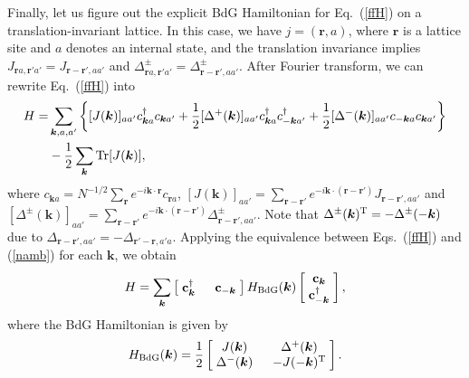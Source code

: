 \documentclass{tADP2e}
\theoremstyle{plain}
\theoremstyle{plain}
\theoremstyle{definition}
\begin{document}
\begin{appendices}
Finally, let us figure out the explicit BdG Hamiltonian for Eq.~(\ref{ffH}) on a translation-invariant lattice. In this case, we have $j=(\boldsymbol{r},a)$, where $\boldsymbol{r}$ is a lattice site and $a$ denotes an internal state, and the translation invariance implies $J_{\boldsymbol{r}a,\boldsymbol{r}'a'}=J_{\boldsymbol{r}-\boldsymbol{r}',aa'}$ and $\Delta^\pm_{\boldsymbol{r}a,\boldsymbol{r}'a'}=\Delta^\pm_{\boldsymbol{r}-\boldsymbol{r}',aa'}$. After Fourier transform, we can rewrite Eq.~(\ref{ffH}) into 
\begin{equation}
\begin{split}
H=&\sum_{\boldsymbol{k},a,a'}\left\{[J(\boldsymbol{k})]_{aa'}c_{\boldsymbol{k}a}^\dag c_{\boldsymbol{k}a'}
+\frac{1}{2}[\Delta^+(\boldsymbol{k})]_{aa'}c_{\boldsymbol{k}a}^\dag c_{-\boldsymbol{k}a'}^\dag+
\frac{1}{2}[\Delta^-(\boldsymbol{k})]_{aa'}c_{-\boldsymbol{k}a} c_{\boldsymbol{k}a'}\right\} \\
&-\frac{1}{2}\sum_{\boldsymbol{k}}{\rm Tr}[J(\boldsymbol{k})],
\end{split}
\end{equation}
where $c_{\boldsymbol{k}a}=N^{-1/2}\sum_{\boldsymbol{r}}e^{-i\boldsymbol{k}\cdot\boldsymbol{r}}c_{\boldsymbol{r}a}$, $[J(\boldsymbol{k})]_{aa'}=\sum_{\boldsymbol{r}-\boldsymbol{r}'}e^{-i\boldsymbol{k}\cdot(\boldsymbol{r}-\boldsymbol{r}')}J_{\boldsymbol{r}-\boldsymbol{r}',aa'}$ and $[\Delta^\pm(\boldsymbol{k})]_{aa'}=\sum_{\boldsymbol{r}-\boldsymbol{r}'}e^{-i\boldsymbol{k}\cdot(\boldsymbol{r}-\boldsymbol{r}')}\Delta^\pm_{\boldsymbol{r}-\boldsymbol{r}',aa'}$. Note that $\Delta^\pm(\boldsymbol{k})^{\rm T}=-\Delta^\pm(-\boldsymbol{k})$ due to $\Delta_{\boldsymbol{r}-\boldsymbol{r}',aa'}=-\Delta_{\boldsymbol{r}'-\boldsymbol{r},a'a}$. Applying the equivalence between Eqs.~(\ref{ffH}) and (\ref{namb}) for each $\boldsymbol{k}$, we obtain
\begin{equation}
H=\sum_{\boldsymbol{k}} \begin{bmatrix} \;\bold{c}_{\boldsymbol{k}}^\dag\; & \;\bold{c}_{-\boldsymbol{k}}\; \end{bmatrix} H_{\rm BdG}(\boldsymbol{k})\begin{bmatrix} \;\bold{c}_{\boldsymbol{k}}\; \\ \;\bold{c}^\dag_{-\boldsymbol{k}}\; \end{bmatrix},
\end{equation}
where the BdG Hamiltonian is given by
\begin{equation}
H_{\rm BdG}(\boldsymbol{k})=\frac{1}{2}\begin{bmatrix} \;J(\boldsymbol{k})\; & \;\Delta^+(\boldsymbol{k})\; \\ \;\Delta^-(\boldsymbol{k})\; & \;-J(-\boldsymbol{k})^{\rm T}\;  \end{bmatrix}.

\end{equation}
\end{appendices}
\end{document}
